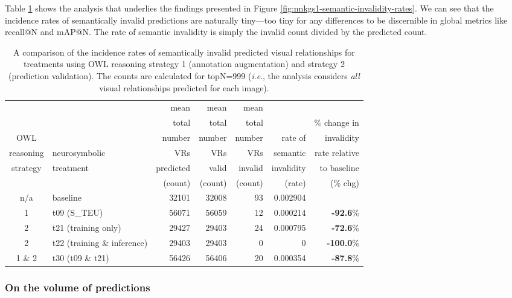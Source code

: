 \documentclass[]{jair}
\newcommand{\ie}{\textit{i}.\textit{e}.,\xspace}
\begin{document}
Table \ref{table:semantic-validity-pvrs} shows the analysis that underlies the findings presented in Figure \ref{fig:nnkgs1-semantic-invalidity-rates}.
We can see that the incidence rates of semantically invalid predictions are naturally tiny---too tiny for any differences to be discernible in global metrics like recall@N and mAP@N.
The rate of semantic invalidity is simply the invalid count divided by the predicted count.

\begin{table}[t]
  \centering
  \footnotesize
  \begin{threeparttable}
  \caption{\footnotesize A comparison of the incidence rates of semantically invalid predicted visual relationships for treatments using OWL reasoning strategy 1 (annotation augmentation) and strategy 2 (prediction validation). The counts are calculated for topN=999 (\ie the analysis considers \emph{all} visual relationships predicted for each image).}
  \label{table:semantic-validity-pvrs}
  \begin{tabular}{clrrrrr}
    \toprule
              &     & mean  & mean  & mean  &          &   \\
              &    & total & total & total &   & \% change in \\
    OWL       &    & number & number & number & rate of & invalidity \\
    reasoning & neurosymbolic  & VRs  & VRs & VRs & semantic & rate relative \\
    strategy  & treatment & predicted & valid & invalid & invalidity & to baseline \\
              &    & (count) & (count) & (count) & (rate) & (\% chg) \\
    \midrule 
    n/a & baseline & 32101 & 32008 & 93 & 0.002904 & \\
    1  & t09 (S\_TEU) & 56071 & 56059 & 12 & 0.000214 & \textbf{-92.6}\% \\
    2  & t21 (training only) & 29427 & 29403 & 24 & 0.000795 & \textbf{-72.6}\% \\
    2  & t22 (training \& inference) & 29403 & 29403 & 0 & 0 & \textbf{-100.0}\% \\
    1 \& 2 & t30 (t09 \& t21) & 56426 & 56406 & 20 & 0.000354 & \textbf{-87.8}\% \\
    \bottomrule 
  \end{tabular}
  \end{threeparttable}
\end{table}

\subsubsection{On the volume of predictions}
\end{document}
